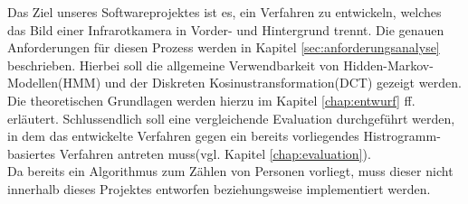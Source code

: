 Das Ziel unseres Softwareprojektes ist es, ein Verfahren zu entwickeln, welches das Bild einer Infrarotkamera in Vorder- und Hintergrund trennt.
 Die genauen Anforderungen für diesen Prozess werden in Kapitel \ref{sec:anforderungsanalyse} beschrieben.
 Hierbei soll die allgemeine Verwendbarkeit von Hidden-Markov-Modellen(HMM)\cite{Stamp04arevealing} und der Diskreten Kosinustransformation(DCT)\cite{Khayam03thediscrete} gezeigt werden.
 Die theoretischen Grundlagen werden hierzu im Kapitel \ref{chap:entwurf} ff. erläutert.
 Schlussendlich soll eine vergleichende Evaluation durchgeführt werden, in dem das entwickelte Verfahren gegen ein bereits vorliegendes Histrogramm-basiertes Verfahren antreten muss(vgl. Kapitel \ref{chap:evaluation}).\\
Da bereits ein Algorithmus zum Zählen von Personen vorliegt, muss dieser nicht innerhalb dieses Projektes entworfen beziehungsweise implementiert werden.

